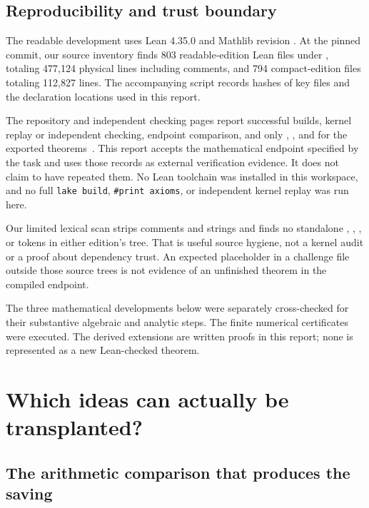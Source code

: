 \subsection{Reproducibility and trust boundary}

The readable development uses Lean 4.35.0 and Mathlib revision
.
At the pinned commit, our source inventory finds 803 readable-edition
Lean files under , totaling 477,124 physical lines including
comments, and 794 compact-edition files totaling 112,827 lines.
The accompanying script records hashes of key files and the declaration
locations used in this report.

The repository and independent checking pages report successful builds,
kernel replay or independent checking, endpoint comparison, and only
, , and  for the
exported theorems~\cite{repo,sutherland-check,sonoda-check,rubinstein-check}.
This report accepts the mathematical endpoint specified by the task and
uses those records as external verification evidence. It does not claim
to have repeated them. No Lean toolchain was installed in this workspace,
and no full \texttt{lake build}, \texttt{\#print axioms}, or independent
kernel replay was run here.

Our limited lexical scan strips comments and strings and finds no
standalone , , , or 
tokens in either edition's  tree. That is useful source hygiene,
not a kernel audit or a proof about dependency trust. An expected
placeholder in a challenge file outside those source trees is not evidence
of an unfinished theorem in the compiled endpoint.

The three mathematical developments below were separately cross-checked
for their substantive algebraic and analytic steps. The finite numerical
certificates were executed. The derived extensions are written proofs
in this report; none is represented as a new Lean-checked theorem.

\section{Which ideas can actually be transplanted?}
\label{sec:mechanism}

\subsection{The arithmetic comparison that produces the saving}

